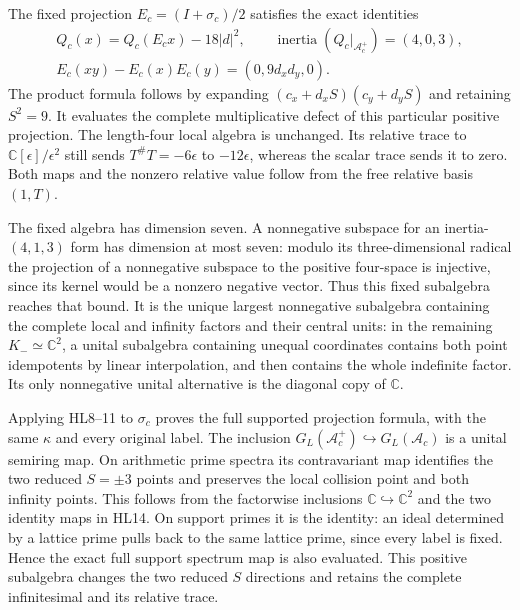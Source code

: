The fixed projection $E_c=(I+\sigma_c)/2$ satisfies the exact
identities
\[
 \begin{gathered}
 Q_c(x)=Q_c(E_cx)-18|d|^2,\qquad
 \operatorname{inertia}(Q_c|_{\mathcal A_c^+})=(4,0,3),\\
 E_c(xy)-E_c(x)E_c(y)
      =(0,9d_xd_y,0).
 \end{gathered}
 \tag{HL15}
\]
The product formula follows by expanding
$(c_x+d_xS)(c_y+d_yS)$ and retaining $S^2=9$.
It evaluates the complete multiplicative defect of this particular
positive projection. The length-four local algebra is unchanged.
Its relative trace to $\mathbb C[\epsilon]/\epsilon^2$ still sends
$T^\#T=-6\epsilon$ to $-12\epsilon$, whereas the scalar trace
sends it to zero. Both maps and the nonzero relative value follow
from the free relative basis $(1,T)$.

The fixed algebra has dimension seven. A nonnegative subspace
for an inertia-$(4,1,3)$ form has dimension at most seven:
modulo its three-dimensional radical the projection of a
nonnegative subspace to the positive four-space is injective,
since its kernel would be a nonzero negative vector.
Thus this fixed subalgebra reaches that bound. It is the unique
largest nonnegative subalgebra containing the complete local and
infinity factors and their central units: in the remaining
$K_-\simeq\mathbb C^2$, a unital subalgebra containing unequal
coordinates contains both point idempotents by linear interpolation,
and then contains the whole indefinite factor. Its only
nonnegative unital alternative is the diagonal copy of $\mathbb C$.

Applying HL8--11 to $\sigma_c$ proves the full supported
projection formula, with the same $\kappa$ and every original
label. The inclusion $G_L(\mathcal A_c^+)\hookrightarrow
G_L(\mathcal A_c)$ is a unital semiring map. On arithmetic
prime spectra its contravariant map identifies the two reduced
$S=\pm3$ points and preserves the local collision point and
both infinity points. This follows from the factorwise
inclusions $\mathbb C\hookrightarrow\mathbb C^2$ and the two
identity maps in HL14. On support primes it is the identity:
an ideal determined by a lattice prime pulls back to the same
lattice prime, since every label is fixed. Hence the exact
full support spectrum map is also evaluated. This positive
subalgebra changes the two reduced $S$ directions and retains
the complete infinitesimal and its relative trace.
